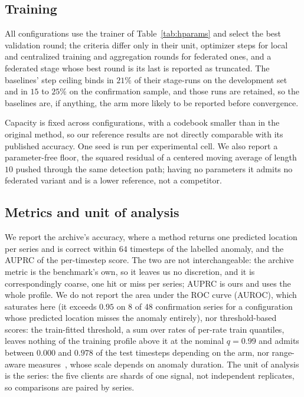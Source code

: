 \documentclass[conference]{IEEEtran}
\begin{document}
\subsection{Training}

All configurations use the trainer of Table~\ref{tab:hparams} and select the best validation round;
the criteria differ only in their unit, optimizer steps for local and centralized training and
aggregation rounds for federated ones, and a federated stage whose best round is its last is
reported as truncated. The baselines' step ceiling binds in $21\%$ of their stage-runs on the
development set and in $15$ to $25\%$ on the confirmation sample, and those runs are retained, so
the baselines are, if anything, the arm more likely to be reported before convergence.

Capacity is fixed across configurations, with a codebook smaller than in the original method, so
our reference results are not directly
comparable with its published accuracy. One seed is run per experimental cell. We also
report a parameter-free floor, the squared residual of a centered moving average of length $10$
pushed through the same detection path; having no parameters it admits no federated variant and is a
lower reference, not a competitor.

\subsection{Metrics and unit of analysis}

We report the archive's accuracy, where a method returns one predicted location per series and is
correct within $64$ timesteps of the labelled anomaly, and the AUPRC of the per-timestep score. The
two are not interchangeable: the archive metric is the benchmark's own, so it leaves us no
discretion, and it is correspondingly coarse, one hit or miss per series; AUPRC is ours and uses the
whole profile. We do not report the area under the ROC curve (AUROC), which saturates here (it
exceeds $0.95$ on 8 of 48
confirmation series for a configuration whose predicted location misses the anomaly entirely), nor
threshold-based scores: the train-fitted threshold, a sum over rates of per-rate train quantiles,
leaves nothing of the training profile above it at the nominal $q=0.99$ and admits between $0.000$
and $0.978$ of the test timesteps depending on the arm, nor range-aware measures~\cite{paparrizos2022vus}, whose scale
depends on anomaly duration. The unit of analysis is the series: the five clients are shards of one
signal, not independent replicates, so comparisons are paired by series.
\end{document}
